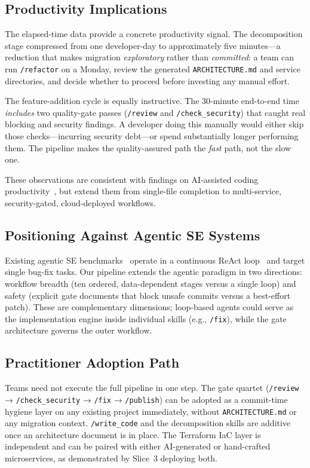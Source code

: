 \documentclass[10pt,journal,compsoc]{IEEEtran}
\begin{document}
\subsection{Productivity Implications}
The elapsed-time data provide a concrete productivity signal.
The decomposition stage compressed from one developer-day to
approximately five minutes—a reduction that makes migration
\emph{exploratory} rather than \emph{committed}: a team can run
\texttt{/refactor} on a Monday, review the generated
\texttt{ARCHITECTURE.md} and service directories, and decide whether
to proceed before investing any manual effort.

The feature-addition cycle is equally instructive.  The 30-minute
end-to-end time \emph{includes} two quality-gate passes
(\texttt{/review} and \texttt{/check\_security}) that caught real
blocking and security findings.  A developer doing this manually
would either skip those checks—incurring security debt—or spend
substantially longer performing them.  The pipeline makes the
quality-assured path the \emph{fast} path, not the slow one.

These observations are consistent with findings on AI-assisted coding
productivity~\cite{peng2023copilot}, but extend them from single-file
completion to multi-service, security-gated, cloud-deployed workflows.

\subsection{Positioning Against Agentic SE Systems}
Existing agentic SE benchmarks~\cite{jimenez2024swebench} operate in
a continuous ReAct loop~\cite{yao2023react} and target single bug-fix
tasks.  Our pipeline extends the agentic paradigm in two directions:
workflow breadth (ten ordered, data-dependent stages versus a single
loop) and safety (explicit gate documents that block unsafe commits
versus a best-effort patch).  These are complementary dimensions;
loop-based agents could serve as the implementation engine inside
individual skills (e.g., \texttt{/fix}), while the gate architecture
governs the outer workflow.

\subsection{Practitioner Adoption Path}
Teams need not execute the full pipeline in one step.
The gate quartet (\texttt{/review} → \texttt{/check\_security} →
\texttt{/fix} → \texttt{/publish}) can be adopted as a commit-time
hygiene layer on any existing project immediately, without
\texttt{ARCHITECTURE.md} or any migration context.
\texttt{/write\_code} and the decomposition skills are additive once
an architecture document is in place.
The Terraform IaC layer is independent and can be paired with either
AI-generated or hand-crafted microservices, as demonstrated by
Slice~3 deploying both.
\end{document}
